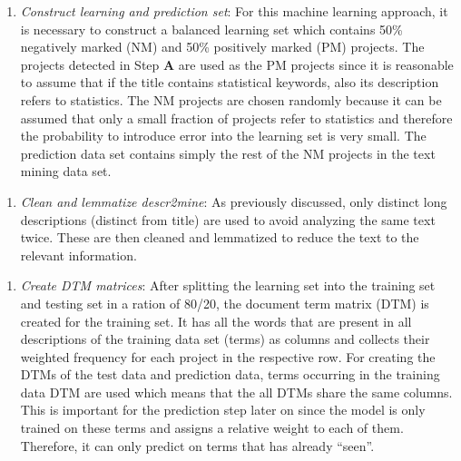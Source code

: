\documentclass[
]{article}
\providecommand{\tightlist}{%
  \setlength{\itemsep}{0pt}\setlength{\parskip}{0pt}}
\begin{document}
\begin{enumerate}
  \begin{enumerate}
  \def\labelenumii{\roman{enumii}.}
  \tightlist
  \item
    \emph{Construct learning and prediction set}: For this machine learning approach, it is necessary to construct a balanced learning set which contains 50\% negatively marked (NM) and 50\% positively marked (PM) projects. The projects detected in Step \textbf{A} are used as the PM projects since it is reasonable to assume that if the title contains statistical keywords, also its description refers to statistics. The NM projects are chosen randomly because it can be assumed that only a small fraction of projects refer to statistics and therefore the probability to introduce error into the learning set is very small. The prediction data set contains simply the rest of the NM projects in the text mining data set.
  \end{enumerate}

  \begin{enumerate}
  \def\labelenumii{\roman{enumii}.}
  \setcounter{enumii}{1}
  \tightlist
  \item
    \emph{Clean and lemmatize descr2mine}: As previously discussed, only distinct long descriptions (distinct from title) are used to avoid analyzing the same text twice. These are then cleaned and lemmatized to reduce the text to the relevant information.
  \end{enumerate}

  \begin{enumerate}
  \def\labelenumii{\roman{enumii}.}
  \setcounter{enumii}{2}
  \tightlist
  \item
    \emph{Create DTM matrices}: After splitting the learning set into the training set and testing set in a ration of 80/20, the document term matrix (DTM) is created for the training set. It has all the words that are present in all descriptions of the training data set (terms) as columns and collects their weighted frequency for each project in the respective row. For creating the DTMs of the test data and prediction data, terms occurring in the training data DTM are used which means that the all DTMs share the same columns. This is important for the prediction step later on since the model is only trained on these terms and assigns a relative weight to each of them. Therefore, it can only predict on terms that has already ``seen''.
  \end{enumerate}


\end{enumerate}
\end{document}
